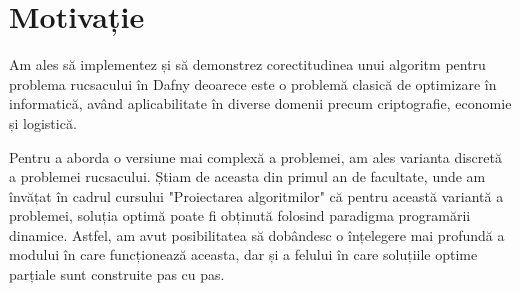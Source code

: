 \chapter*{Motivație} 

Am ales să implementez și să demonstrez corectitudinea unui algoritm pentru problema rucsacului în Dafny deoarece este o problemă clasică de optimizare în informatică, având aplicabilitate în diverse domenii precum criptografie, economie și logistică. \par 
Pentru a aborda o versiune mai complexă a problemei, am ales varianta discretă a problemei rucsacului. Știam de aceasta din primul an de facultate, unde am învățat în cadrul cursului "Proiectarea algoritmilor" că pentru această variantă a problemei, soluția optimă poate fi obținută folosind paradigma programării dinamice. Astfel, am avut posibilitatea să dobândesc o înțelegere mai profundă a modului în care funcționează aceasta, dar și a felului în care soluțiile optime parțiale sunt construite pas cu pas.